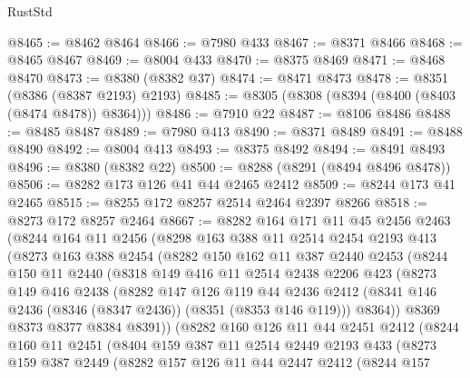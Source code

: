 \begin{lexlean}{RustStd}
\begin{coremodule}
@8465 := @8462 @8464
@8466 := @7980 @433
@8467 := @8371 @8466
@8468 := @8465 @8467
@8469 := @8004 @433
@8470 := @8375 @8469
@8471 := @8468 @8470
@8473 := @8380 (@8382 @37)
@8474 := @8471 @8473
@8478 := @8351 (@8386 (@8387 @2193) @2193)
@8485 := @8305 (@8308 (@8394 (@8400 (@8403 (@8474 @8478)) @8364)))
@8486 := @7910 @22
@8487 := @8106 @8486
@8488 := @8485 @8487
@8489 := @7980 @413
@8490 := @8371 @8489
@8491 := @8488 @8490
@8492 := @8004 @413
@8493 := @8375 @8492
@8494 := @8491 @8493
@8496 := @8380 (@8382 @22)
@8500 := @8288 (@8291 (@8494 @8496 @8478))
@8506 := @8282 @173 @126 @41 @44 @2465 @2412
@8509 := @8244 @173 @41 @2465
@8515 := @8255 @172 @8257 @2514 @2464 @2397 @8266
@8518 := @8273 @172 @8257 @2464
@8667 := @8282
    @164
    @171
    @11
    @45
    @2456
    @2463
    (@8244
      @164
      @11
      @2456
      (@8298
        @163
        @388
        @11
        @2514
        @2454
        @2193
        @413
        (@8273
          @163
          @388
          @2454
          (@8282
            @150
            @162
            @11
            @387
            @2440
            @2453
            (@8244
              @150
              @11
              @2440
              (@8318
                @149
                @416
                @11
                @2514
                @2438
                @2206
                @423
                (@8273
                  @149
                  @416
                  @2438
                  (@8282
                    @147
                    @126
                    @119
                    @44
                    @2436
                    @2412
                    (@8341 @146 @2436 (@8346 (@8347 @2436)) (@8351 (@8353 @146 @119)))
                    @8364))
                @8369
                @8373
                @8377
                @8384
                @8391))
            (@8282
              @160
              @126
              @11
              @44
              @2451
              @2412
              (@8244
                @160
                @11
                @2451
                (@8404
                  @159
                  @387
                  @11
                  @2514
                  @2449
                  @2193
                  @433
                  (@8273
                    @159
                    @387
                    @2449
                    (@8282
                      @157
                      @126
                      @11
                      @44
                      @2447
                      @2412
                      (@8244
                        @157

\end{coremodule}
\end{lexlean}
